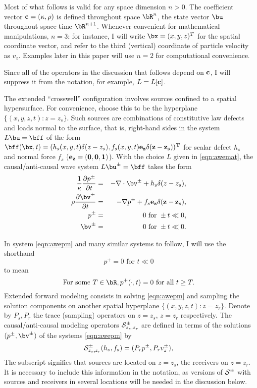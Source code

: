 Most of what follows is valid for any space dimension $n >0$. The
coefficient vector $\bf{c}=(\kappa,\rho)$ is defined throughout space
$\bR^n$, the state vector $\bu$ throughout space-time
$\bR^{n+1}$. Whenever convenient for mathematical manipulations,
$n=3$: for instance, I will write $\bx=(x,y,z)^T$ for the spatial
coordinate vector, and refer to the third (vertical) coordinate of
particle velocity as $v_z$. Examples
later in this paper will use $n=2$ for computational convenience.

Since all of the operators in the discussion that follows depend on
$\bf{c}$, I will suppress it from the notation, for example, $L=L[\bf{c}]$.

The extended ``crosswell'' configuration involves sources confined to
a spatial hypersurface. For convenience, choose this to be the hyperplane
$\{(x,y,z,t): z=z_s\}$. Such sources are combinations of constitutive law defects and
loads normal to the surface, that is, right-hand sides in the system
$L\bu=\bff$ of the form $\bff(\bx,t) =
(h_s(x,y,t)\delta(z-z_s), f_s(x,y,t)\bf{e}_z\delta(z-z_s))^T$ for scalar
defect $h_s$ and normal force $f_s$  ($\bf{e}_z=(0,0,1)$). With the choice $L$ given in \ref{eqn:awemat}, the causal/anti-causal wave system $L\bu^{\pm}=\bff$ takes the form
\begin{eqnarray}
\label{eqn:awepm}
\frac{1}{\kappa}\frac{\partial p^{\pm}}{\partial t} & = & - \nabla \cdot \bv^{\pm} +
h_s \delta(z-z_s), \nonumber \\
\rho\frac{\partial \bv^{\pm}}{\partial t} & = & - \nabla p^{\pm} + f_s\bf{e}_z \delta(z-z_s),\nonumber \\
p^{\pm} & =& 0 \mbox{ for } \pm t \ll 0,\nonumber\\ 
\bv^{\pm} & = & 0 \mbox{ for } \pm t \ll 0.
\end{eqnarray}

 In system \ref{eqn:awepm} and many similar
systems to follow, I will use the shorthand
\[
  p^+ = 0 \mbox{ for } t \ll 0
\]
to mean
\[
  \mbox{For some } T \in \bR, p^+(\cdot,t) = 0 \mbox{ for all } t \ge
  T.
\]
Extended forward modeling consists in solving \ref{eqn:awepm} and
sampling the solution components on another spatial hyperplane $\{(x,y,z,t): z=z_r\}$. Denote by $P_s,P_r$ the trace (sampling) operators on $z=z_s$, $z=z_r$
respectively. The causal/anti-causal modeling operators
${\cal S}^{\pm}_{z_s,z_r}$ are defined in
terms of the solutions $(p^{\pm},\bv^{\pm})$ of the systems
\ref{eqn:awepm} by
\begin{equation}
  {\cal S}^{\pm}_{z_s,z_r}(h_s,f_s)  = (P_rp^{\pm},P_r v_z^{\pm}),
  \label{eqn:fwd}
\end{equation}
The subscript signifies that sources are located on $z=z_s$, the
receivers on $z=z_r$. It is necessary to include this information in
the notation, as versions of ${\cal S}^{\pm}$ with sources and receivers in
several locations will be needed in the discussion below.

